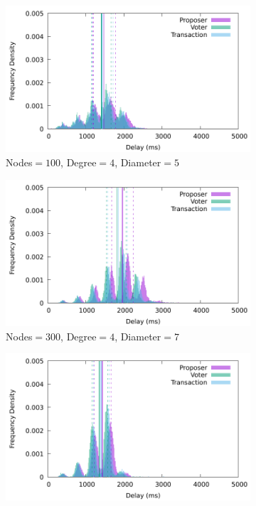 \begin{figure}[t]
    \centering
    \begin{subfigure}{.5\textwidth}
        \centering
   \includegraphics[width=\linewidth]{figures/delay100nodes.pdf}
   \caption{Nodes$=100$, Degree$=4$, Diameter$=5$}%
   \label{fig:propagation1}
    \end{subfigure}%
    \begin{subfigure}{.5\textwidth}
   \centering
   \includegraphics[width=\linewidth]{figures/delay300nodes4.pdf}
   \caption{Nodes$=300$, Degree$=4$, Diameter$=7$}%
   \label{fig:propagation2}
 \end{subfigure}%
    \newline
    \begin{subfigure}{.5\textwidth}
   \centering
   \includegraphics[width=\linewidth]{figures/delay300nodes6.pdf}

\end{subfigure}
\end{figure}
